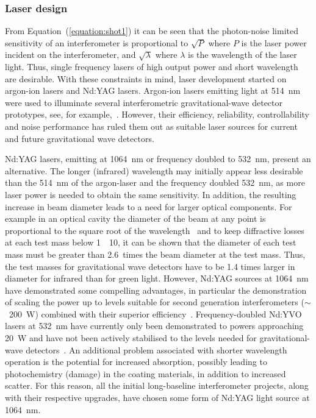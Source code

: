 \documentclass{article}
\begin{document}

\subsubsection{Laser design}
\label{subsubsection:laserdesign}

From Equation~(\ref{equation:shot1}) it can be seen that the photon-noise
limited sensitivity of an interferometer is proportional to $\sqrt{P}$ where $P$
is the laser power incident on the interferometer, and $\sqrt{\lambda}$ where
$\lambda$ is the wavelength of the laser light. Thus, single frequency lasers of
high output power and short wavelength are desirable. With these constraints in
mind, laser development started on argon-ion lasers and Nd:YAG lasers.
Argon-ion lasers emitting light at 514~nm were used to illuminate several
interferometric gravitational-wave detector prototypes, see, for
example,~\cite{Shoemaker, Robertson}.  However, their efficiency, reliability,
controllability and noise performance has ruled them out as suitable laser
sources for current and future gravitational wave detectors.

Nd:YAG lasers, emitting at 1064~nm or frequency doubled to 532~nm, present an
alternative. The longer (infrared) wavelength may initially appear less
desirable than the 514~nm of the argon-laser and the frequency doubled
532~nm, as more laser power is needed to obtain the same sensitivity.  In
addition, the resulting increase in beam diameter leads to a need for larger
optical components. For example in an optical cavity the diameter of the beam at
any point is proportional to the square root of the wavelength~\cite{Kogelnik}
and to keep diffractive losses at each test mass below
1~\texttimes~10, it can be shown that the diameter of each
test mass must be greater than 2.6~times the beam diameter at the test
mass. Thus, the test masses for gravitational wave detectors have to be
1.4 times larger in diameter for infrared than for green light. However, Nd:YAG
sources at 1064~nm have demonstrated some compelling
advantages, in particular the demonstration of scaling the power up to
levels suitable for second generation interferometers ($\sim$~200~W)
combined with their superior
efficiency~\cite{Shine,Vogt,Kerr}. Frequency-doubled Nd:YVO lasers at
532~nm have currently only been demonstrated to powers approaching
20~W and have not been actively stabilised to the levels needed for
gravitational-wave detectors~\cite{Mavalvala:2010}. An additional
problem associated with shorter wavelength operation is the potential
for increased absorption, possibly leading to photochemistry (damage)
in the coating materials, in addition to increased scatter. For this
reason, all the initial long-baseline interferometer projects,
along with their respective upgrades, have chosen some form of Nd:YAG
light source at 1064~nm.
\end{document}
